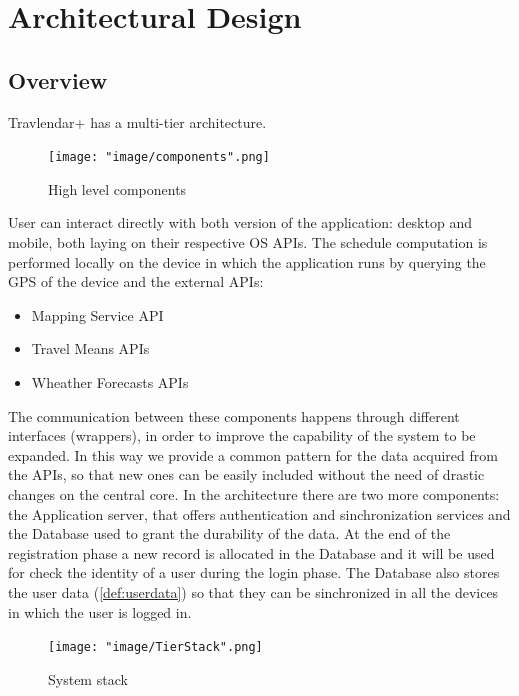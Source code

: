 \chapter{Architectural Design}

\section{Overview}

Travlendar+ has a multi-tier architecture.

\begin{figure}[H]
\begin{center}
\texttt{[image: "image/components".png]}
\caption{High level components}
\end{center}
\end{figure}
 
User can interact directly with both version of the application: desktop and mobile, both laying on their respective OS APIs. The schedule computation is performed locally on the device in which the application runs by querying the GPS of the device and the external APIs:

\begin{itemize}
\item Mapping Service API
\item Travel Means APIs
\item Wheather Forecasts APIs
\end{itemize}

The communication between these components happens through different interfaces (wrappers), in order to improve the capability of the system to be expanded. In this way we provide a common pattern for the data acquired from the APIs, so that new ones can be easily included without the need of drastic changes on the central core.
In the architecture there are two more components: the Application server, that offers authentication and sinchronization services and the Database used to grant the durability of the data. At the end of the registration phase a new record is allocated in the Database and it will be used for check the identity of a user during the login phase. The Database also stores the user data (\ref{def:userdata}) so that they can be sinchronized in all the devices in which the user is logged in. 

\begin{figure}[H]
\begin{center}
\texttt{[image: "image/TierStack".png]}
\caption{System stack}
\end{center}
\end{figure}

